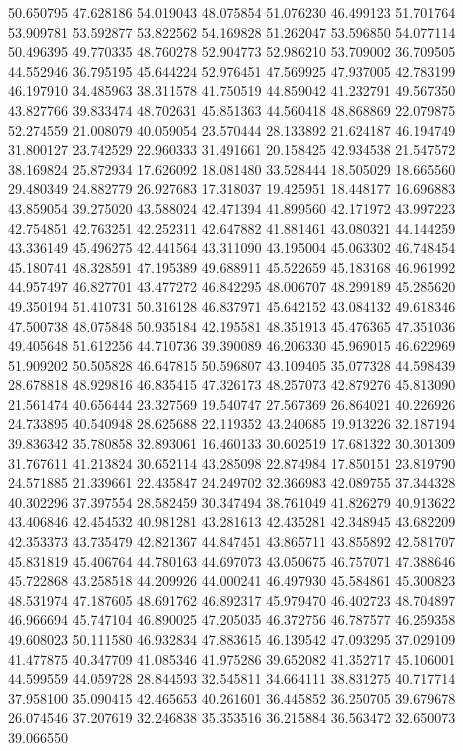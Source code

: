 50.650795
47.628186
54.019043
48.075854
51.076230
46.499123
51.701764
53.909781
53.592877
53.822562
54.169828
51.262047
53.596850
54.077114
50.496395
49.770335
48.760278
52.904773
52.986210
53.709002
36.709505
44.552946
36.795195
45.644224
52.976451
47.569925
47.937005
42.783199
46.197910
34.485963
38.311578
41.750519
44.859042
41.232791
49.567350
43.827766
39.833474
48.702631
45.851363
44.560418
48.868869
22.079875
52.274559
21.008079
40.059054
23.570444
28.133892
21.624187
46.194749
31.800127
23.742529
22.960333
31.491661
20.158425
42.934538
21.547572
38.169824
25.872934
17.626092
18.081480
33.528444
18.505029
18.665560
29.480349
24.882779
26.927683
17.318037
19.425951
18.448177
16.696883
43.859054
39.275020
43.588024
42.471394
41.899560
42.171972
43.997223
42.754851
42.763251
42.252311
42.647882
41.881461
43.080321
44.144259
43.336149
45.496275
42.441564
43.311090
43.195004
45.063302
46.748454
45.180741
48.328591
47.195389
49.688911
45.522659
45.183168
46.961992
44.957497
46.827701
43.477272
46.842295
48.006707
48.299189
45.285620
49.350194
51.410731
50.316128
46.837971
45.642152
43.084132
49.618346
47.500738
48.075848
50.935184
42.195581
48.351913
45.476365
47.351036
49.405648
51.612256
44.710736
39.390089
46.206330
45.969015
46.622969
51.909202
50.505828
46.647815
50.596807
43.109405
35.077328
44.598439
28.678818
48.929816
46.835415
47.326173
48.257073
42.879276
45.813090
21.561474
40.656444
23.327569
19.540747
27.567369
26.864021
40.226926
24.733895
40.540948
28.625688
22.119352
43.240685
19.913226
32.187194
39.836342
35.780858
32.893061
16.460133
30.602519
17.681322
30.301309
31.767611
41.213824
30.652114
43.285098
22.874984
17.850151
23.819790
24.571885
21.339661
22.435847
24.249702
32.366983
42.089755
37.344328
40.302296
37.397554
28.582459
30.347494
38.761049
41.826279
40.913622
43.406846
42.454532
40.981281
43.281613
42.435281
42.348945
43.682209
42.353373
43.735479
42.821367
44.847451
43.865711
43.855892
42.581707
45.831819
45.406764
44.780163
44.697073
43.050675
46.757071
47.388646
45.722868
43.258518
44.209926
44.000241
46.497930
45.584861
45.300823
48.531974
47.187605
48.691762
46.892317
45.979470
46.402723
48.704897
46.966694
45.747104
46.890025
47.205035
46.372756
46.787577
46.259358
49.608023
50.111580
46.932834
47.883615
46.139542
47.093295
37.029109
41.477875
40.347709
41.085346
41.975286
39.652082
41.352717
45.106001
44.599559
44.059728
28.844593
32.545811
34.664111
38.831275
40.717714
37.958100
35.090415
42.465653
40.261601
36.445852
36.250705
39.679678
26.074546
37.207619
32.246838
35.353516
36.215884
36.563472
32.650073
39.066550
